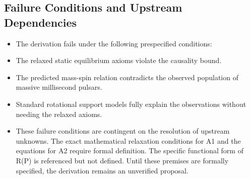 \documentclass[conference]{IEEEtran}
\begin{document}
\subsection{Failure Conditions and Upstream Dependencies}
\begin{itemize}
\item The derivation fails under the following prespecified conditions:
\item The relaxed static equilibrium axioms violate the causality bound.
\item The predicted mass-spin relation contradicts the observed population of massive millisecond pulsars.
\item Standard rotational support models fully explain the observations without needing the relaxed axioms.
\item These failure conditions are contingent on the resolution of upstream unknowns. The exact mathematical relaxation conditions for A1 and the equations for A2 require formal definition. The specific functional form of R(P) is referenced but not defined. Until these premises are formally specified, the derivation remains an unverified proposal.
\end{itemize}
\end{document}
